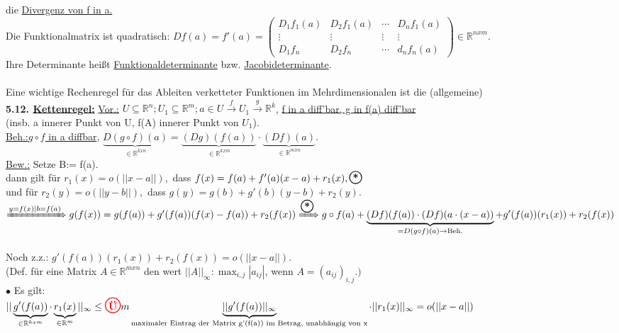 \documentclass[]{scrartcl}
\newcommand{\redcircle}[1]{%
	\tikz[baseline=(char.base)]{
		\node[shape=circle, draw=red, text=red, thick, inner sep=1pt] (char) 
		{\textbf{#1}};
	}%
}
\newcommand{\blackcircle}[1]{%
	\tikz[baseline=(char.base)]{
		\node[shape=circle, draw=black, text=black, thick, inner sep=1pt] (char) 
		{\textbf{#1}};
	}%
}
\begin{document}
	die \ul{Divergenz von f in a.}\\
	Die Funktionalmatrix ist quadratisch: $Df(a)=f'(a)=\begin{pmatrix}
		D_1f_1(a)&D_2f_1(a)&\cdots&D_nf_1(a)\\
		\vdots&\vdots&\vdots&\vdots\\
		D_1f_n&D_2f_n&\cdots&d_nf_n(a)
	\end{pmatrix}\in \mathbb{R}^{n x m}.$\\
	Ihre Determinante heißt \ul{Funktionaldeterminante} bzw. \ul{Jacobideterminante}.\\
	\\
	Eine wichtige Rechenregel für das Ableiten verketteter Funktionen im Mehrdimensionalen ist die (allgemeine)\\
	\textbf{5.12. \ul{Kettenregel:}} \underline{Vor.:} $ U \subseteq\mathbb{R}^n; U_1\subseteq\mathbb{R}^m; a\in U\xrightarrow{f} U_1\xrightarrow{g}\mathbb{R}^k$, \ul{f in a diff'bar, g in f(a) diff'bar}\\
	(insb. a innerer Punkt von U, f(A) innerer Punkt von $U_1$).\\
	\underline{Beh.:}\ul{$g\circ f$ in a diffbar},  $\underbrace{D(g\circ f) (a)}_{\in\mathbb{R}^{k x n}}=\underbrace{(Dg)(f(a))}_{\in\mathbb{R}^{k x m}}\cdot \underbrace{(Df)(a)}_{\in\mathbb{R}^{m x n}}$.\\
	\underline{Bew.:} Setze B:= f(a).\\
	dann gilt für $r_1(x)=o(||x-a||),$ dass $ f(x)=f(a)+f'(a)(x-a)+r_1(x), \blackcircle{*}$\\
	und für $r_2(y)=o(||y-b||),$ dass $ g(y)=g(b)+g'(b)(y-b)+r_2(y).$\\
	$\xRightarrow{y=f(x)|b=f(a)} g(f(x))=g(f(a))+g'(f(a))(f(x)-f(a))+r_2(f(x))\\
	\xRightarrow{\blackcircle{*}}g \circ f (a)+\underbrace{(Df)(f(a))\cdot (Df)(a\cdot(x-a))}_{=D(g\circ f)(a)\rightarrow\text{Beh.}}+g'(f(a))(r_1(x))+r_2(f(x))$\\
	\\
	Noch z.z.: $g'(f(a))(r_1(x))+r_2(f(x))=o(||x-a||).$\\
	(Def. für eine Matrix $A\in \mathbb{R}^{m x n}$ den wert 
	$||A||_\infty:\max_{i,j}|a_{ij}|$, wenn $A=(a_{ij})_{i,j}.)$\\
	$\bullet$ Es gilt:\\
	$||\underbrace{g'(f(a))}_{\in\mathbb{R}^{k x m}}\cdot 
	\underbrace{r_1(x)}_{\in \mathbb{R}^m}||_\infty \leq\redcircle{Ü} 
	m\underbrace{||g'(f(a))||_\infty}_{\text{maximaler Eintrag der Matrix 
	g'(f(a)) im Betrag, unabhängig von x}}\cdot ||r_1(x)||_\infty=o(||x-a||)$ 
\end{document}
